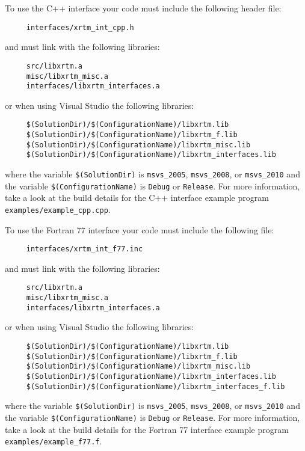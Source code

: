 \label{building_and_using_xrtm_using_xrtm_in_your_code_cpp}

To use the C++ interface your code must include the following header file:
\begin{verbatim}
     interfaces/xrtm_int_cpp.h
\end{verbatim}
and must link with the following libraries:
\begin{verbatim}
     src/libxrtm.a
     misc/libxrtm_misc.a
     interfaces/libxrtm_interfaces.a
\end{verbatim}
or when using Visual Studio the following libraries:
\begin{verbatim}
     $(SolutionDir)/$(ConfigurationName)/libxrtm.lib
     $(SolutionDir)/$(ConfigurationName)/libxrtm_f.lib
     $(SolutionDir)/$(ConfigurationName)/libxrtm_misc.lib
     $(SolutionDir)/$(ConfigurationName)/libxrtm_interfaces.lib
\end{verbatim}
where the variable \texttt{\$(SolutionDir)} is \texttt{msvs\_2005}, \texttt{msvs\_2008}, or \texttt{msvs\_2010} and the variable \texttt{\$(ConfigurationName)} is \texttt{Debug} or \texttt{Release}.  For more information, take a look at the build details for the C++ interface example program \texttt{examples/example\_cpp.cpp}.


\label{building_and_using_xrtm_using_xrtm_in_your_code_fortran_77}

To use the Fortran 77 interface your code must include the following file:
\begin{verbatim}
     interfaces/xrtm_int_f77.inc
\end{verbatim}
and must link with the following libraries:
\begin{verbatim}
     src/libxrtm.a
     misc/libxrtm_misc.a
     interfaces/libxrtm_interfaces.a
\end{verbatim}
or when using Visual Studio the following libraries:
\begin{verbatim}
     $(SolutionDir)/$(ConfigurationName)/libxrtm.lib
     $(SolutionDir)/$(ConfigurationName)/libxrtm_f.lib
     $(SolutionDir)/$(ConfigurationName)/libxrtm_misc.lib
     $(SolutionDir)/$(ConfigurationName)/libxrtm_interfaces.lib
     $(SolutionDir)/$(ConfigurationName)/libxrtm_interfaces_f.lib
\end{verbatim}
where the variable \texttt{\$(SolutionDir)} is \texttt{msvs\_2005}, \texttt{msvs\_2008}, or \texttt{msvs\_2010} and the variable \texttt{\$(ConfigurationName)} is \texttt{Debug} or \texttt{Release}.  For more information, take a look at the build details for the Fortran 77 interface example program \texttt{examples/example\_f77.f}.


